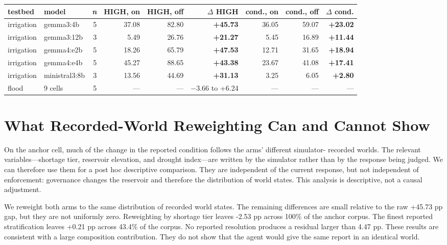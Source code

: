 \documentclass{article}
\begin{document}
\begin{center}
\small
\setlength{\tabcolsep}{3pt}
\begin{tabular}{llrrrrrrr}
\hline
testbed & model & \textit{n} & HIGH, on & HIGH, off & $\Delta$ HIGH & cond., on & cond., off & $\Delta$ cond. \\
\hline
irrigation & gemma3:4b & 5 & 37.08 & 82.80 & \textbf{+45.73} & 36.05 & 59.07 & \textbf{+23.02} \\
irrigation & gemma3:12b & 3 & 5.49 & 26.76 & \textbf{+21.27} & 5.45 & 16.89 & \textbf{+11.44} \\
irrigation & gemma4:e2b & 5 & 18.26 & 65.79 & \textbf{+47.53} & 12.71 & 31.65 & \textbf{+18.94} \\
irrigation & gemma4:e4b & 5 & 45.27 & 88.65 & \textbf{+43.38} & 23.67 & 41.08 & \textbf{+17.41} \\
irrigation & ministral3:8b & 3 & 13.56 & 44.69 & \textbf{+31.13} & 3.25 & 6.05 & \textbf{+2.80} \\
flood & 9 cells & 5 & --- & --- & $-$3.66 to +6.24 & --- & --- & --- \\
\hline
\end{tabular}
\end{center}

\section{What Recorded-World Reweighting Can and Cannot Show}
On the anchor cell, much of the change in the reported condition follows the arms' different simulator- recorded worlds. The relevant variables---shortage tier, reservoir elevation, and drought index---are written by the simulator rather than by the response being judged. We can therefore use them for a post hoc descriptive comparison. They are independent of the current response, but not independent of enforcement: governance changes the reservoir and therefore the distribution of world states. This analysis is descriptive, not a causal adjustment.

We reweight both arms to the same distribution of recorded world states. The remaining differences are small relative to the raw +45.73 pp gap, but they are not uniformly zero. Reweighting by shortage tier leaves -2.53 pp across 100\% of the anchor corpus. The finest reported stratification leaves +0.21 pp across 43.4\% of the corpus. No reported resolution produces a residual larger than 4.47 pp. These results are consistent with a large composition contribution. They do not show that the agent would give the same report in an identical world.
\end{document}
